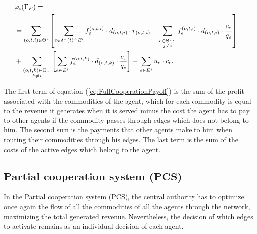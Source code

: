 \documentclass{article}
\begin{document}
\begin{enumerate}
\begin{equation}
    \hspace{-10pt}\begin{split}
    & \varphi_i(\Gamma_F) =\label{eq:FullCooperationPayoff} \\
    & = \sum_{(o,t,i)\in \Theta^i} \left[ \sum_{e \in \delta^-(t)\cap E^i} f_e^{(o,t,i)} \cdot d_{(o,t,i)} \cdot r_{(o,t,i)} -  \sum_{\substack{e\in \Theta^j \colon\\ j\not = i}} f_e^{(o,t,i)} \cdot d_{(o,t,i)} \cdot \frac{c_e}{q_e} \right]  \\
    & + \sum_{\substack{(o,t,k) \in \Theta  \colon \\ k \not = i}} \left[\sum_{e \in E^i} f_e^{(o,t,k)} \cdot d_{(o,t,k)} \cdot \frac{c_e}{q_e}\right] - \sum_{e \in E^i} u_e \cdot c_e, 
    \end{split}
\end{equation}

\end{enumerate}


The first term of equation (\ref{eq:FullCooperationPayoff}) is the sum of the profit associated with the commodities of the agent, which for each commodity is equal to the revenue it
generates when it is served minus the cost the agent has to pay to other agents if the commodity passes through edges which does not belong to him. The second sum is the payments that other agents make to him when routing their commodities through his edges. The last term is the sum of the costs of the active edges which belong to the agent.

\subsection{Partial cooperation system (PCS)}

In the Partial cooperation system (PCS), the central authority has to optimize once again the flow of all the commodities of all the agents through the network, maximizing the total generated revenue. Nevertheless, the decision of which edges to activate remains as an individual decision of each agent.
\end{document}
